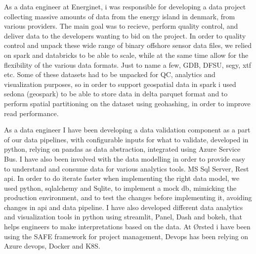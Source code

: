 As a data engineer at Energinet, i was responsible for developing a data project collecting massive amounts of data from the energy island in denmark, from various providers.
 The main goal was to recieve, perform quality control, and deliver data to the developers wanting to bid on the project.
 In order to quality control and unpack these wide range of binary offshore sensor data files, we relied on spark and databricks to be able to scale, while at the same time allow for the flexibility of the various data formats.
 Just to name a few, GDB, DFSU, segy, xtf etc.
 Some of these datasets had to be unpacked for QC, analytics and visualization purposes, so in order to support geospatial data in spark i used sedona (geospark) to be able to store data in delta parquet format and to perform spatial partitioning on the dataset using geohashing, in order to improve read performance.

          
\divider

As a data engineer I have been developing a data validation component as a part of our data pipelines, with configurable inputs for what to validate, developed in python, relying on pandas as data abstraction, integrated using Azure Service Bus.
 I have also been involved with the data modelling in order to provide easy to understand and consume data for various analytics tools.
 MS Sql Server, Rest api.
 In order to do iterate faster when implementing the right data model, we used python, sqlalchemy and Sqlite, to implement a mock db, mimicking the production environment, and to test the changes before implementing it, avoiding changes in api and data pipeline.
 I have also developed different data analytics and visualization tools in python using streamlit, Panel, Dash and bokeh, that helps engineers to make interpretations based on the data.
 At Ørsted i have been using the SAFE framework for project management, Devops has been relying on Azure devops, Docker and K8S.

              
\divider

